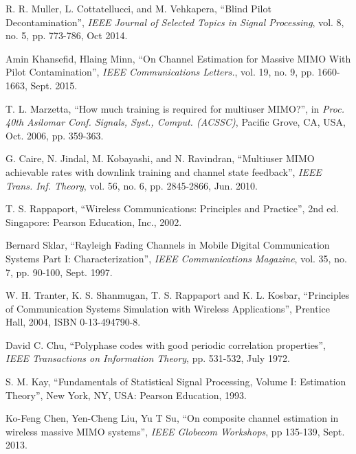 \documentclass[journal,12pt,onecolumn]{IEEEtran}
\begin{document}
\begin{thebibliography}{1}
R. R. Muller, L. Cottatellucci, and M. Vehkapera, \textquotedblleft{Blind Pilot Decontamination\textquotedblright}, \emph{IEEE Journal of Selected Topics in Signal Processing}, vol. 8, no. 5, pp. 773-786, Oct 2014.

Amin Khansefid, Hlaing Minn, 
\textquotedblleft{On Channel Estimation for Massive MIMO With Pilot Contamination\textquotedblright}, \emph{IEEE Communications Letters.}, vol. 19, no. 9, pp. 1660-1663, Sept. 2015.



T. L. Marzetta, \textquotedblleft{How much training is required for multiuser MIMO?\textquotedblright}, in \emph{Proc. 40th Asilomar Conf. Signals, Syst., Comput. (ACSSC)}, Pacific Grove, CA, USA, Oct. 2006, pp. 359-363.

G. Caire, N. Jindal, M. Kobayashi, and N. Ravindran, \textquotedblleft{Multiuser MIMO achievable rates with downlink training and channel state feedback\textquotedblright}, \emph{IEEE Trans. Inf. Theory}, vol. 56, no. 6, pp. 2845-2866, Jun. 2010.

T. S. Rappaport, \textquotedblleft{Wireless Communications: Principles and Practice\textquotedblright}, 2nd ed. Singapore: Pearson Education, Inc., 2002.

Bernard Sklar, \textquotedblleft{Rayleigh Fading Channels in Mobile Digital Communication Systems Part I: Characterization\textquotedblright}, \emph{IEEE Communications Magazine}, vol. 35, no. 7, pp. 90-100, Sept. 1997.

W. H. Tranter, K. S. Shanmugan, T. S. Rappaport and K. L. Kosbar, \textquotedblleft{Principles of Communication Systems Simulation with Wireless Applications\textquotedblright}, Prentice Hall, 2004, ISBN 0-13-494790-8.

David C. Chu, \textquotedblleft{Polyphase codes with good periodic correlation properties\textquotedblright}, \emph{IEEE Transactions on Information Theory}, pp. 531-532, July 1972.

S. M. Kay, \textquotedblleft{Fundamentals of Statistical Signal Processing, Volume I: Estimation Theory\textquotedblright}, New York, NY, USA: Pearson Education, 1993.

Ko-Feng Chen, Yen-Cheng Liu, Yu T Su, \textquotedblleft{On composite channel estimation in wireless massive MIMO systems\textquotedblright}, \emph{IEEE Globecom Workshops}, pp 135-139, Sept. 2013.

\end{thebibliography}
 
\end{document}
